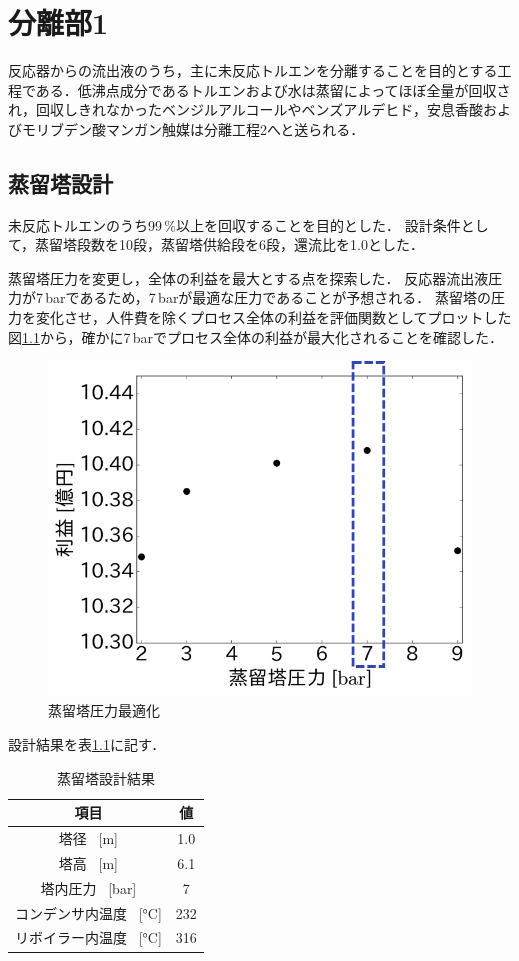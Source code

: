 \documentclass[a4j]{jsreport}
\begin{document}
\clearpage
\chapter{分離部1}
反応器からの流出液のうち，主に未反応トルエンを分離することを目的とする工程である．低沸点成分であるトルエンおよび水は蒸留によってほぼ全量が回収され，回収しきれなかったベンジルアルコールやベンズアルデヒド，安息香酸およびモリブデン酸マンガン触媒は分離工程2へと送られる．
\section{蒸留塔設計}
未反応トルエンのうち99\,\%以上を回収することを目的とした．
設計条件として，蒸留塔段数を10段，蒸留塔供給段を6段，還流比を1.0とした．

蒸留塔圧力を変更し，全体の利益を最大とする点を探索した．
反応器流出液圧力が7\,\si{\bar}であるため，7\,\si{\bar}が最適な圧力であることが予想される．
蒸留塔の圧力を変化させ，人件費を除くプロセス全体の利益を評価関数としてプロットした
図\ref{蒸留塔圧力最適化}から，確かに7\,\si{\bar}でプロセス全体の利益が最大化されることを確認した．
\begin{figure}[htbp]
  \centering
  \includegraphics[scale=0.7]{DistillationPressue.png}
  \caption{蒸留塔圧力最適化}
  \label{蒸留塔圧力最適化}
\end{figure}

設計結果を表\ref{蒸留塔設計結果}に記す．
\clearpage
\begin{table}[htbp]
  \label{蒸留塔設計結果}
  \caption{蒸留塔設計結果}
  \centering
  \begin{tabular}{cc}
      \hline
      項目 & 値 \\
      \hline
      塔径 \, [\si{\metre}] & 1.0 \\
      塔高 \, [\si{\metre}] & 6.1 \\
      塔内圧力 \, [\si{\bar}] &7 \\
      コンデンサ内温度 \, [\si{\degreeCelsius}] & 232 \\
      リボイラー内温度 \, [\si{\degreeCelsius}] & 316 \\
      \hline
  \end{tabular}
\end{table}
\end{document}
